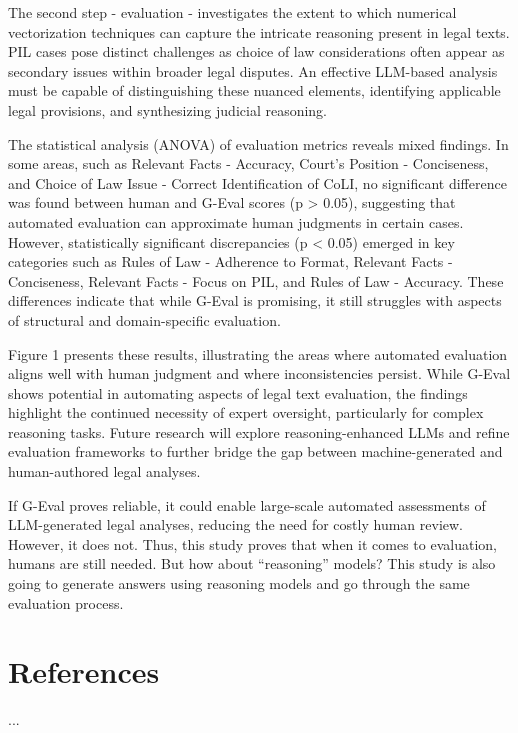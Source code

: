\documentclass[a4paper,12pt]{article}
\begin{document}
The second step - evaluation - investigates the extent to which numerical vectorization techniques can capture the intricate reasoning present in legal texts. PIL cases pose distinct challenges as choice of law considerations often appear as secondary issues within broader legal disputes. An effective LLM-based analysis must be capable of distinguishing these nuanced elements, identifying applicable legal provisions, and synthesizing judicial reasoning.

The statistical analysis (ANOVA) of evaluation metrics reveals mixed findings. In some areas, such as Relevant Facts - Accuracy, Court’s Position - Conciseness, and Choice of Law Issue - Correct Identification of CoLI, no significant difference was found between human and G-Eval scores (p > 0.05), suggesting that automated evaluation can approximate human judgments in certain cases. However, statistically significant discrepancies (p < 0.05) emerged in key categories such as Rules of Law - Adherence to Format, Relevant Facts - Conciseness, Relevant Facts - Focus on PIL, and Rules of Law - Accuracy. These differences indicate that while G-Eval is promising, it still struggles with aspects of structural and domain-specific evaluation.

Figure 1 presents these results, illustrating the areas where automated evaluation aligns well with human judgment and where inconsistencies persist. While G-Eval shows potential in automating aspects of legal text evaluation, the findings highlight the continued necessity of expert oversight, particularly for complex reasoning tasks. Future research will explore reasoning-enhanced LLMs and refine evaluation frameworks to further bridge the gap between machine-generated and human-authored legal analyses.

If G-Eval proves reliable, it could enable large-scale automated assessments of LLM-generated legal analyses, reducing the need for costly human review. However, it does not. Thus, this study proves that when it comes to evaluation, humans are still needed. But how about ``reasoning'' models? This study is also going to generate answers using reasoning models and go through the same evaluation process.

\section*{References}
...
\end{document}
